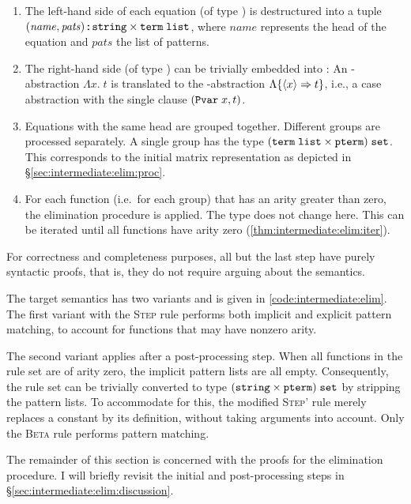 \begin{enumerate}
  \item
    The left-hand side of each equation (of type ) is destructured into a tuple $(\mathit{name}, \allowbreak\mathit{pats})\allowbreak \mathbin{:\!\!:} \texttt{\textup{string}} \times \texttt{\textup{term}}\;\texttt{\textup{list}}$, where $\mathit{name}$ represents the head of the equation and $\mathit{pats}$ the list of patterns.
  \item
    The right-hand side (of type ) can be trivially embedded into :
    An -abstraction $\Lambda x.\;t$ is translated to the -abstraction $\Lambda \{\left\langle x\right\rangle \Rightarrow t\}$, i.e., a case abstraction with the single clause $(\texttt{\textup{Pvar}}\;x, t)$.
  \item
    Equations with the same head are grouped together.
    Different groups are processed separately.
    A single group has the type $(\texttt{\textup{term}}\;\texttt{\textup{list}} \times \texttt{\textup{pterm}})\;\texttt{\textup{set}}$.
    This corresponds to the initial matrix representation as depicted in §\ref{sec:intermediate:elim:proc}.
  \item
    For each function (i.e.\ for each group) that has an arity greater than zero, the elimination procedure is applied.
    The type does not change here.
    This can be iterated until all functions have arity zero (\cref{thm:intermediate:elim:iter}).
\end{enumerate}
%
For correctness and completeness purposes, all but the last step have purely syntactic proofs, that is, they do not require arguing about the semantics.

The target semantics has two variants and is given in \cref{code:intermediate:elim}.
The first variant with the \textsc{Step} rule performs both implicit and explicit pattern matching, to account for functions that may have nonzero arity.

The second variant applies after a post-processing step.
When all functions in the rule set are of arity zero, the implicit pattern lists are all empty.
Consequently, the rule set can be trivially converted to type $(\texttt{\textup{string}} \times \texttt{\textup{pterm}})\;\texttt{\textup{set}}$ by stripping the pattern lists.
To accommodate for this, the modified \textsc{Step'} rule merely replaces a constant by its definition, without taking arguments into account.
Only the \textsc{Beta} rule performs pattern matching.

The remainder of this section is concerned with the proofs for the elimination procedure.
I will briefly revisit the initial and post-processing steps in §\ref{sec:intermediate:elim:discussion}.

